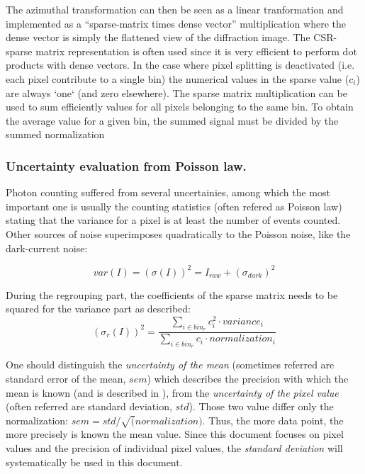 \documentclass[preprint]{iucr}              %
\begin{document}
The azimuthal transformation can then be seen as a linear tranformation and implemented as a ``sparse-matrix times dense vector'' multiplication 
where the dense vector is simply the flattened view of the diffraction image\cite{pyFAI_gpu}. 
The CSR-sparse matrix representation is often used since it is very efficient to perform dot products with dense vectors.
In the case where pixel splitting is deactivated (i.e. each pixel contribute to a single bin) the numerical values in the sparse value ($c_i$) are always `one` (and zero elsewhere).
The sparse matrix multiplication can be used to sum efficiently values for all pixels belonging to the same bin.
To obtain the average value for a given bin, the summed signal must be divided by the summed normalization 
  
\subsubsection{Uncertainty evaluation from Poisson law.}
Photon counting suffered from several uncertainies, among which the most important one is usually the counting statistics (often refered as Poisson law)
stating that the variance for a pixel is at least the number of events counted.
Other sources of noise superimposes quadratically to the Poisson noise, like the dark-current noise:     

\begin{equation}
var(I) = (\sigma(I))^{2} = I_{raw} + (\sigma_{dark})^{2}  
\end{equation}

During the regrouping part, the coefficients of the sparse matrix needs to be squared for the variance part as described: 
\begin{equation}
(\sigma_{r}(I))^2 = \frac{\sum\limits_{i \in bin_r} c_i^2 \cdot variance_i}
                  {\sum\limits_{i \in bin_r} c_i \cdot normalization_i} 
\end{equation}

One should distinguish the \textit{uncertainty of the mean} (sometimes referred are standard error of the mean, $sem$) 
which describes the precision with which the mean is known (and is described in \cite{pyfai_2020}),
from the \textit{uncertainty of the pixel value} (often referred are standard deviation, $std$). 
Those two value differ only the normalization: $sem = std/\sqrt(normalization)$.
Thus, the more data point, the more precisely is known the mean value.
Since this document focuses on pixel values and the precision of individual pixel values, the \textit{standard deviation} will systematically be used in this document.  
\end{document}
